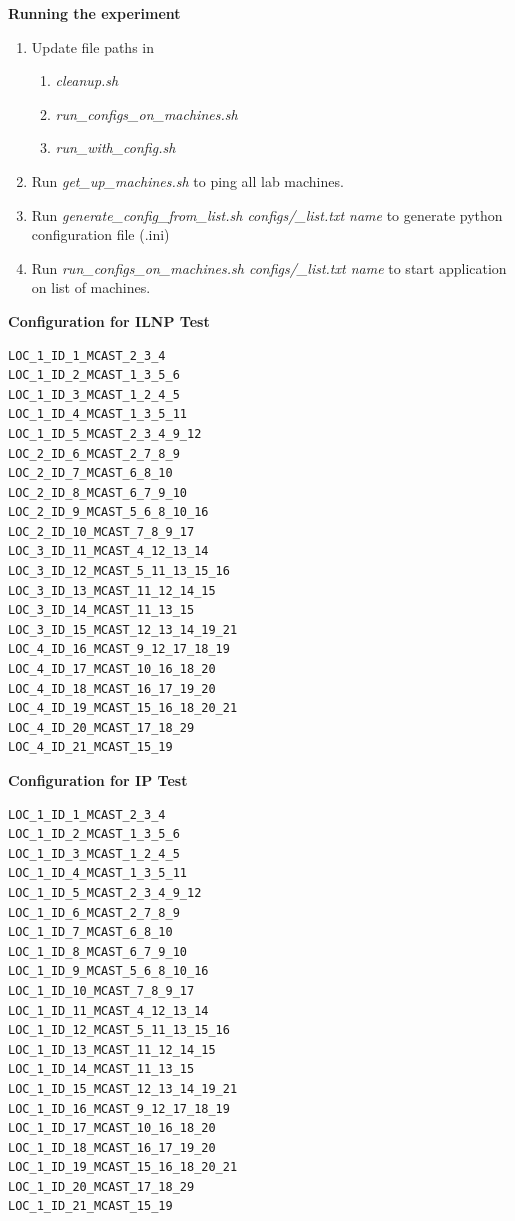 \documentclass[12pt]{article}
\begin{document}
\textbf{Running the experiment}
\begin{enumerate}
	\item Update file paths in 
	\begin{enumerate}
		\item \emph{cleanup.sh}
		\item \emph{run\_configs\_on\_machines.sh}
		\item \emph{run\_with\_config.sh}
	\end{enumerate}
	\item Run \emph{get\_up\_machines.sh} to ping all lab machines.
	\item Run \emph{generate\_config\_from\_list.sh configs/\_list.txt name} to generate python configuration file (.ini)
	\item Run \emph{run\_configs\_on\_machines.sh configs/\_list.txt name} to start application on list of machines.

\end{enumerate}

\noindent\textbf{Configuration for ILNP Test}

\begin{lstlisting}
LOC_1_ID_1_MCAST_2_3_4
LOC_1_ID_2_MCAST_1_3_5_6
LOC_1_ID_3_MCAST_1_2_4_5
LOC_1_ID_4_MCAST_1_3_5_11
LOC_1_ID_5_MCAST_2_3_4_9_12
LOC_2_ID_6_MCAST_2_7_8_9
LOC_2_ID_7_MCAST_6_8_10
LOC_2_ID_8_MCAST_6_7_9_10
LOC_2_ID_9_MCAST_5_6_8_10_16
LOC_2_ID_10_MCAST_7_8_9_17
LOC_3_ID_11_MCAST_4_12_13_14
LOC_3_ID_12_MCAST_5_11_13_15_16
LOC_3_ID_13_MCAST_11_12_14_15
LOC_3_ID_14_MCAST_11_13_15
LOC_3_ID_15_MCAST_12_13_14_19_21
LOC_4_ID_16_MCAST_9_12_17_18_19
LOC_4_ID_17_MCAST_10_16_18_20
LOC_4_ID_18_MCAST_16_17_19_20
LOC_4_ID_19_MCAST_15_16_18_20_21
LOC_4_ID_20_MCAST_17_18_29
LOC_4_ID_21_MCAST_15_19
\end{lstlisting}

\noindent\textbf{Configuration for IP Test}
\begin{lstlisting}
LOC_1_ID_1_MCAST_2_3_4
LOC_1_ID_2_MCAST_1_3_5_6
LOC_1_ID_3_MCAST_1_2_4_5
LOC_1_ID_4_MCAST_1_3_5_11
LOC_1_ID_5_MCAST_2_3_4_9_12
LOC_1_ID_6_MCAST_2_7_8_9
LOC_1_ID_7_MCAST_6_8_10
LOC_1_ID_8_MCAST_6_7_9_10
LOC_1_ID_9_MCAST_5_6_8_10_16
LOC_1_ID_10_MCAST_7_8_9_17
LOC_1_ID_11_MCAST_4_12_13_14
LOC_1_ID_12_MCAST_5_11_13_15_16
LOC_1_ID_13_MCAST_11_12_14_15
LOC_1_ID_14_MCAST_11_13_15
LOC_1_ID_15_MCAST_12_13_14_19_21
LOC_1_ID_16_MCAST_9_12_17_18_19
LOC_1_ID_17_MCAST_10_16_18_20
LOC_1_ID_18_MCAST_16_17_19_20
LOC_1_ID_19_MCAST_15_16_18_20_21
LOC_1_ID_20_MCAST_17_18_29
LOC_1_ID_21_MCAST_15_19
\end{lstlisting}



\end{document}
